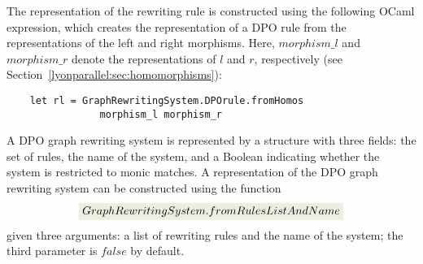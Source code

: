 \noindent The representation of the rewriting rule is constructed using the following OCaml expression, which creates the representation of a DPO rule from the representations of the left and right morphisms. Here, \colorbox{Ivory2}{$morphism\_l$} and \colorbox{Ivory2}{$morphism\_r$} denote the representations of $l$ and $r$, respectively (see Section~\ref{lyonparallel:sec:homomorphisms}):
\begin{verbatim}
    let rl = GraphRewritingSystem.DPOrule.fromHomos 
                morphism_l morphism_r
\end{verbatim}

A DPO graph rewriting system is represented by a structure with three fields: the set of rules, the name of the system, and a Boolean indicating whether the system is restricted to monic matches. A representation of the DPO graph rewriting system
can be constructed using the function 
$$\colorbox{Ivory2}{$GraphRewritingSystem.fromRulesListAndName$}$$ given three arguments: a list of rewriting rules and the name of the system; the third parameter is \colorbox{Ivory2}{$false$} by default.

